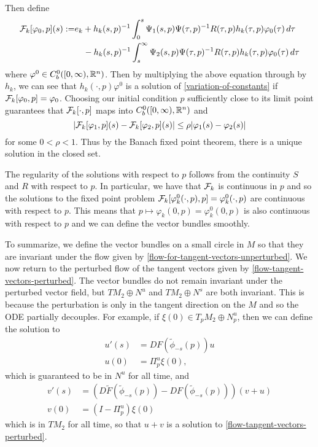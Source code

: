 Then define
\begin{equation}
\begin{aligned}
	\mathcal{F}_k[\varphi_0, p](s) :=& e_k + h_k(s,p)^{-1}\int_0^s \Psi_1(s, p) \Psi(\tau, p)^{-1}R(\tau, p) h_k(\tau,p)\varphi_0(\tau)\, d\tau \\
	&\quad - h_k(s,p)^{-1}\int_s^\infty \Psi_2(s,p) \Psi(\tau, p)^{-1} R(\tau, p)h_k(\tau,p) \varphi_0(\tau)\, d\tau
\end{aligned}
\end{equation}
where \(\varphi^0\in C^0_b([0,\infty), \mathbb{R}^n)\). Then by multiplying the above equation through by \(h_k\), we can see that \(h_k(\cdot, p)\varphi^0\) is a solution of \cref{variation-of-constants} if \(\mathcal{F}_k[\varphi_0, p] = \varphi_0\). Choosing our initial condition \(p\) sufficiently close to its limit point guarantees that \(\mathcal{F}_k[\cdot, p]\) maps into \(C^0_b([0,\infty), \mathbb{R}^n)\) and
\begin{equation}
	|\mathcal{F}_k[\varphi_1, p](s) - \mathcal{F}_k[\varphi_2, p](s) | \leq \rho  |\varphi_1(s) - \varphi_2(s)| 
\end{equation}
for some \(0< \rho < 1\). Thus by the Banach fixed point theorem, there is a unique solution in the closed set.

The regularity of the solutions with respect to \(p\) follows from the continuity \(S\) and \(R\) with respect to \(p\). In particular, we have that \(\mathcal{F}_k\) is continuous in \(p\) and so the solutions to the fixed point problem \(\mathcal{F}_k[\varphi_k^0(\cdot, p) , p] = \varphi_k^0(\cdot, p)\) are continuous with respect to \(p\). This means that \(p\mapsto \varphi_k(0,p) = \varphi_k^0(0,p) \) is also continuous with respect to \(p\) and we can define the vector bundles smoothly.

To summarize, we define the vector bundles on a small circle in \(M\) so that they are invariant under the flow given by \cref{flow-for-tangent-vectors-unperturbed}. We now return to the perturbed flow of the tangent vectors given by \cref{flow-tangent-vectors-perturbed}. The vector bundles do not remain invariant under the perturbed vector field, but \(TM_2 \oplus N^u\) and \(TM_2 \oplus N^s\) are both invariant. This is because the perturbation is only in the tangent direction on the \(M\) and so the ODE partially decouples. For example, if \(\xi(0) \in T_pM_2 \oplus N^u_p\), then we can define the solution to 
\begin{equation}
\begin{aligned}
	u'(s) &= DF(\tilde \phi_{-s}(p)) u\\
	u(0) &= \Pi^u_p \xi(0),
\end{aligned}
\end{equation}
which is guaranteed to be in \(N^u\) for all time, and 
\begin{equation}
\begin{aligned}
	v'(s) &= (D\tilde F(\tilde\phi_{-s}(p)) - DF(\tilde\phi_{-s}(p))) (v + u) \\
	v(0) &= (I - \Pi^u_p) \xi(0)
\end{aligned}
\end{equation}
which is in \(TM_2\) for all time, so that \(u + v\) is a solution to \cref{flow-tangent-vectors-perturbed}.